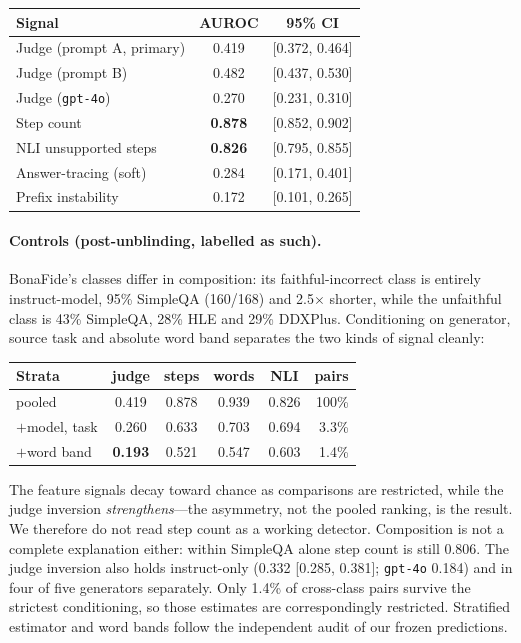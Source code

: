\documentclass[11pt]{article}
\begin{document}
\begin{center}\small
\begin{tabular}{@{}lcc@{}}
\toprule
\textbf{Signal} & \textbf{AUROC} & \textbf{95\% CI} \\
\midrule
Judge (prompt A, primary) & 0.419 & [0.372, 0.464] \\
Judge (prompt B)          & 0.482 & [0.437, 0.530] \\
Judge (\texttt{gpt-4o})   & 0.270 & [0.231, 0.310] \\
Step count                & \textbf{0.878} & [0.852, 0.902] \\
NLI unsupported steps     & \textbf{0.826} & [0.795, 0.855] \\
Answer-tracing (soft)     & 0.284 & [0.171, 0.401] \\
Prefix instability        & 0.172 & [0.101, 0.265] \\
\bottomrule
\end{tabular}
\end{center}

\paragraph{Controls (post-unblinding, labelled as such).} BonaFide's classes differ in composition:
its faithful-incorrect class is entirely instruct-model, 95\% SimpleQA (160/168) and 2.5$\times$
shorter, while the unfaithful class is 43\% SimpleQA, 28\% HLE and 29\% DDXPlus. Conditioning on
generator, source task and absolute word band separates the two kinds of signal cleanly:

\begin{center}\footnotesize
\setlength{\tabcolsep}{3.5pt}
\begin{tabular}{@{}lccccr@{}}
\toprule
\textbf{Strata} & \textbf{judge} & \textbf{steps} & \textbf{words} & \textbf{NLI} & \textbf{pairs} \\
\midrule
pooled & 0.419 & 0.878 & 0.939 & 0.826 & 100\% \\
$+$model, task & 0.260 & 0.633 & 0.703 & 0.694 & 3.3\% \\
$+$word band & \textbf{0.193} & 0.521 & 0.547 & 0.603 & 1.4\% \\
\bottomrule
\end{tabular}
\end{center}

The feature signals decay toward chance as comparisons are restricted, while the judge inversion
\emph{strengthens}---the asymmetry, not the pooled ranking, is the result. We therefore do not read
step count as a working detector. Composition is not a complete explanation either: within SimpleQA
alone step count is still 0.806. The judge inversion also holds instruct-only (0.332 [0.285, 0.381];
\texttt{gpt-4o} 0.184) and in four of five generators separately. Only 1.4\% of cross-class pairs
survive the strictest conditioning, so those estimates are correspondingly restricted. Stratified
estimator and word bands follow the independent audit of our frozen predictions.
\end{document}
